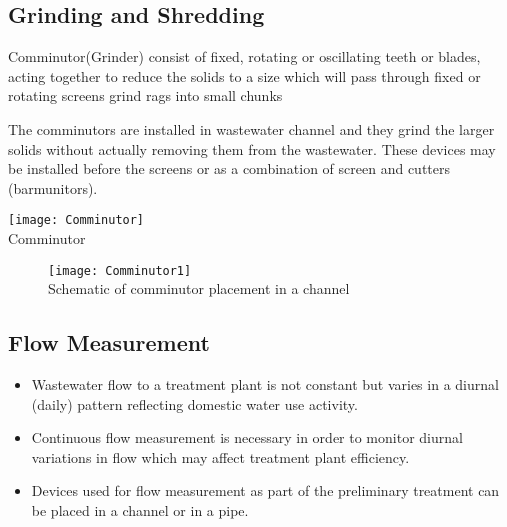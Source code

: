 		\subsection{Grinding and Shredding}

					\begin{itemize}
\begin{minipage}{\textwidth}	\item Comminutor(Grinder) consist of fixed, rotating or oscillating teeth or blades, acting together to reduce the solids to a size which will pass through fixed or rotating screens grind rags into small chunks
\item The comminutors are installed in wastewater channel and they grind the larger solids without actually removing them from the wastewater.  These devices may be installed before the screens or as a combination of screen and cutters (barmunitors).
					\end{minipage}	
					\end{itemize}
					\begin{minipage}{\textwidth}
					\begin{center}
      \texttt{[image: Comminutor]}\\
      Comminutor\\
\end{center}
    \end{minipage}

\begin{figure}[h]
    \texttt{[image: Comminutor1]}\\
    \hspace{5cm}Schematic of comminutor placement in a channel\\
  \end{figure}
  
		\subsection{Flow Measurement}
					\begin{itemize}
						\item Wastewater flow to a treatment plant is not constant but varies in a diurnal (daily) pattern reflecting domestic water use activity.
						\item Continuous flow measurement is necessary in order to monitor diurnal variations in flow which may affect treatment plant efficiency.\\
						\item Devices used for flow measurement as part of the preliminary treatment can be placed in a channel or in a pipe.
					\end{itemize}

